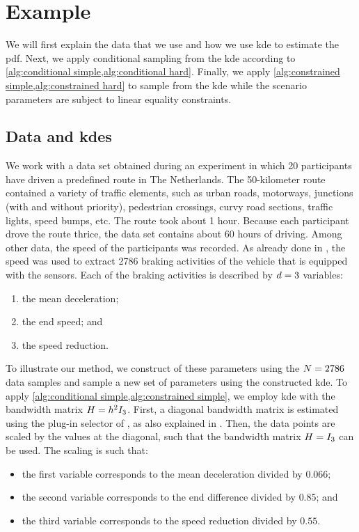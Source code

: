 \section{Example}
\label{sec:example}

We will first explain the data that we use and how we use \ac{kde} to estimate the \ac{pdf}.
Next, we apply conditional sampling from the \ac{kde} according to \cref{alg:conditional simple,alg:conditional hard}.
Finally, we apply \cref{alg:constrained simple,alg:constrained hard} to sample from the \ac{kde} while the scenario parameters are subject to linear equality constraints.



\subsection{Data and \acp{kde}}
\label{sec:example data}

\cstarta We work with a data set obtained during an experiment in which 20 participants have driven a predefined route in The Netherlands.
The 50-kilometer route contained a variety of traffic elements, such as urban roads, motorways, junctions (with and without priority), pedestrian crossings, curvy road sections, traffic lights, speed bumps, etc.
The route took about 1 hour.
Because each participant drove the route thrice, the data set contains about 60 hours of driving.
Among other data, the speed of the participants was recorded.
As already done in \autocite{deGelder2017assessment, degelder2019completeness}, the speed was used to extract 2786 braking activities of the vehicle that is equipped with the sensors. \cenda
Each of the braking activities is described by $d=3$ variables:
\begin{enumerate}
	\item the mean deceleration;
	\item the end speed; and
	\item the speed reduction.
\end{enumerate}

\cstarta To illustrate our method, we construct  of these parameters using the $N=2786$ data samples and sample a new set of parameters using the constructed \ac{kde}. \cenda
To apply \cref{alg:conditional simple,alg:constrained simple}, we employ \ac{kde} with the bandwidth matrix $H=h^2I_{3}$. 
First, a diagonal bandwidth matrix is estimated using the plug-in selector of \textcite{wand1994multivariate}, as also explained in \autocite{duong2007ks}.
Then, the data points are scaled by the values at the diagonal, such that the bandwidth matrix $H=I_{3}$ can be used. 
The scaling is such that:
\begin{itemize}
	\item the first variable corresponds to the mean deceleration divided by $0.066$;
	\item the second variable corresponds to the end difference divided by $0.85$; and
	\item the third variable corresponds to the speed reduction divided by $0.55$.
\end{itemize}

